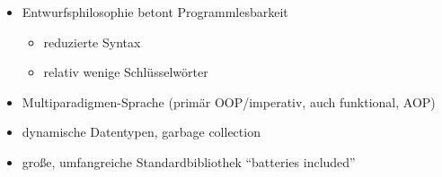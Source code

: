 \documentclass[
    t,
    smaller,
    compress,
    xcolor=svgnames,            %
    table,
]{beamer}
\begin{document}
\begin{frame}
  \begin{itemize}[<1->]
    \item Entwurfsphilosophie betont Programmlesbarkeit
    \begin{itemize}[<1->]
      \item reduzierte Syntax
      \item relativ wenige Schlüsselwörter
    \end{itemize}
    \item Multiparadigmen-Sprache (primär OOP/imperativ, auch funktional, AOP)
    \item dynamische Datentypen, garbage collection
    \item große, umfangreiche Standardbibliothek “batteries included”
  \end{itemize}


\end{frame}


\end{document}
